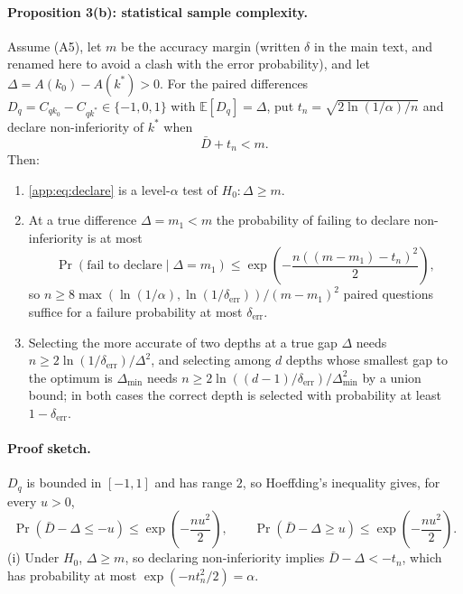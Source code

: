 \paragraph{Proposition 3(b): statistical sample complexity.} Assume (A5), let
$m$ be the accuracy margin (written $\delta$ in the main text, and renamed here
to avoid a clash with the error probability), and let
$\Delta=A(k_{0})-A(k^{*})>0$. For the paired differences
$D_{q}=C_{qk_{0}}-C_{qk^{*}}\in\{-1,0,1\}$ with
$\mathbb{E}[D_{q}]=\Delta$, put
$t_{n}=\sqrt{2\ln(1/\alpha)/n}$ and declare non-inferiority of $k^{*}$ when
\begin{equation}\label{app:eq:declare}
  \bar D+t_{n}<m .
\end{equation}
Then:
\begin{enumerate}
  \item[(i)] \eqref{app:eq:declare} is a level-$\alpha$ test of
  $H_{0}:\Delta\ge m$.
  \item[(ii)] At a true difference $\Delta=m_{1}<m$ the probability of failing to
  declare non-inferiority is at most
  \begin{equation}\label{app:eq:hoeffding}
    \Pr\left(\text{fail to declare}\mid \Delta=m_{1}\right)
    \le\exp\left(-\frac{n\left(\left(m-m_{1}\right)-t_{n}\right)^{2}}{2}\right),
  \end{equation}
  so $n\ge8\max\left(\ln(1/\alpha),\ln(1/\delta_{\mathrm{err}})\right)/(m-m_{1})^{2}$
  paired questions suffice for a failure probability at most
  $\delta_{\mathrm{err}}$.
  \item[(iii)] Selecting the more accurate of two depths at a true gap $\Delta$
  needs $n\ge2\ln(1/\delta_{\mathrm{err}})/\Delta^{2}$, and selecting among $d$
  depths whose smallest gap to the optimum is $\Delta_{\min}$ needs
  $n\ge2\ln\left((d-1)/\delta_{\mathrm{err}}\right)/\Delta_{\min}^{2}$ by a union
  bound; in both cases the correct depth is selected with probability at least
  $1-\delta_{\mathrm{err}}$.
\end{enumerate}

\paragraph{Proof sketch.} $D_{q}$ is bounded in $[-1,1]$ and has range $2$, so
Hoeffding's inequality gives, for every $u>0$,
\begin{equation}\label{app:eq:two-tails}
  \Pr\left(\bar D-\Delta\le-u\right)\le\exp\left(-\frac{nu^{2}}{2}\right),
  \qquad
  \Pr\left(\bar D-\Delta\ge u\right)\le\exp\left(-\frac{nu^{2}}{2}\right).
\end{equation}
(i) Under $H_{0}$, $\Delta\ge m$, so declaring non-inferiority implies
$\bar D-\Delta<-t_{n}$, which has probability at most
$\exp(-nt_{n}^{2}/2)=\alpha$.

